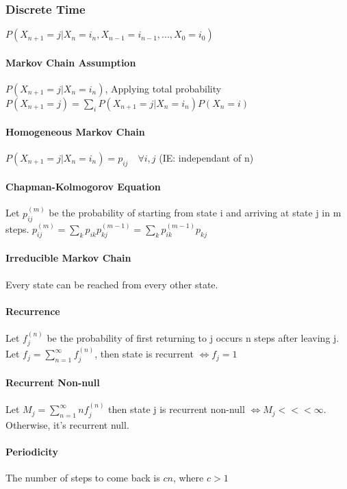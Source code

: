 

\subsubsection{Discrete Time}
$P(X_{n+1} = j | X_n = i_n , X_{n-1} = i_{n-1}, ... , X_0 = i_0)$

\paragraph{Markov Chain Assumption}
$P(X_{n+1} = j | X_n = i_n )$, Applying total probability
$P(X_{n+1} = j ) = \sum_{i} P(X_{n+1} = j |  X_n = i_n) P(X_n = i)$

\paragraph{Homogeneous Markov Chain}
$P(X_{n+1} = j | X_n = i_n ) = p_{ij} \quad \forall i,j$ (IE: independant of n)

\paragraph{Chapman-Kolmogorov Equation}
Let $p_{ij}^(m)$ be the probability of starting from state i and arriving at state j in m steps.
$p_{ij}^{(m)} = \sum_k p_{ik} p_{kj}^{(m-1)} = \sum_k p_{ik}^{(m-1)}p_{kj}$

\paragraph{Irreducible Markov Chain} Every state can be reached from every other state.

\paragraph{Recurrence}
Let $f_j^{(n)}$ be the probability of first returning to j occurs n steps after leaving j. \\
Let $f_j = \sum_{n=1}^\infty f_j^{(n)}$, then
state is recurrent $\iff f_j = 1$

\paragraph{Recurrent Non-null}
Let $M_j = \sum_{n=1}^\infty n f_j^{(n)}$ then state j is recurrent non-null
$\iff M_j <<< \infty$. Otherwise, it's recurrent null.

\paragraph{Periodicity} The number of steps to come back is $cn$, where $c > 1$

